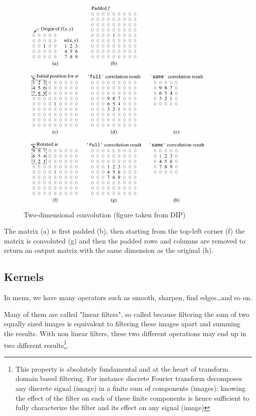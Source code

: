 \begin{figure}[htbp]
\begin{center}
\includegraphics[width=10cm]{fig/CMCIBasicCourse201102-img52.png}
\caption{ Two-dimensional convolution (figure taken from DIP)}
\label{fig:img52}
\end{center}
\end{figure}

The matrix (a) is first padded (b), then starting from the top-left
corner (f) the matrix is convoluted (g) and then the padded rows and
columns are removed to return an output matrix with the same dimension
as the original (h).

\subsection{Kernels}

In \ijmenu{[Process]} menu, we have many operators such
as smooth, sharpen, find edges\dots and so on. 


Many of them are called "linear filters", so called because filtering the sum of two equally sized images is equivalent to filtering these images apart and summing the results. With non linear filters, these two different operations may end up in two different results\footnote{This property is absolutely fundamental and at the heart of transform domain based filtering. For instance discrete Fourier transform decomposes any discrete signal (image) in a finite sum of components (images): knowing the effect of the filter on each of these finite components is hence sufficient to fully characterize the filter and its effect on any signal (image)}. 


